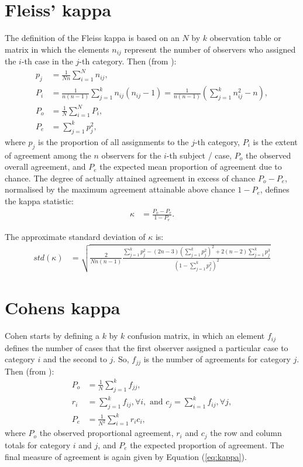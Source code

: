 \documentclass[]{article}
\begin{document}
\section{Fleiss' kappa}\label{sec:Fleiss}

The definition of the Fleiss kappa is based on an $N$ by $k$
observation table or matrix in which the elements $n_{ij}$ represent
the number of observers who assigned the $i$-th case in the $j$-th
category. Then (from \cite{Fleiss71}):
\begin{align}
p_j &= \frac{1}{N n} \sum_{i = 1}^N n_{ij}, \\
P_i &= \frac{1}{n(n-1)} \sum_{j = 1}^k n_{ij} (n_{ij} - 1) =
\frac{1}{n(n-1)} \left( \sum_{j = 1}^k n_{ij}^2 - n \right), \\
P_o &= \frac{1}{N} \sum_{i = 1}^N P_i, \\
P_e &= \sum_{j = 1}^k p_j^2,
\end{align}
where $p_j$ is the proportion of all assignments to the $j$-th
category, $P_i$ is the extent of agreement among the $n$ observers
for the $i$-th subject / case, $P_o$ the observed overall agreement,
and $P_e$ the expected mean proportion of agreement due to chance.
The degree of actually attained agreement in excess of chance $P_o -
P_e$, normalised by the maximum agreement attainable above chance $1
- P_e$, defines the kappa statistic:
\begin{align}
\kappa &= \frac{P_o - P_e}{1 - P_e}.\label{eq:kappa}
\end{align}

The approximate standard deviation of $\kappa$ is:
\begin{align}
\mathit{std}(\kappa) &= \sqrt{ \frac{2}{Nn(n-1)} \frac{\sum_{j = 1}^k
p_j^2 - (2n-3)\left( \sum_{j=1}^k p_j^2 \right)^2 + 2(n-2)
\sum_{j=1}^k p_j^3}{ \left( 1 - \sum_{j=1}^k p_j^2 \right)^2} }
\end{align}


\section{Cohens kappa}\label{sec:Cohen}

Cohen starts by defining a $k$ by $k$ confusion matrix, in which an
element $f_{ij}$ defines the number of cases that the first observer
assigned a particular case to category $i$ and the second to $j$. So,
$f_{jj}$ is the number of agreements for category $j$. Then (from
\cite{Altman91}):
\begin{align}
P_o &= \frac{1}{N} \sum_{j = 1}^k f_{jj}, \\
r_i &= \sum_{j = 1}^k f_{ij}, \forall i, \text{ and }
c_j = \sum_{i = 1}^k f_{ij}, \forall j, \\
P_e &= \frac{1}{N^2} \sum_{i = 1}^k r_i c_i,
\end{align}
where $P_o$ the observed proportional agreement, $r_i$ and $c_j$ the
row and column totals for category $i$ and $j$, and $P_e$ the
expected proportion of agreement. The final measure of agreement is
again given by Equation (\ref{eq:kappa}).
\end{document}
